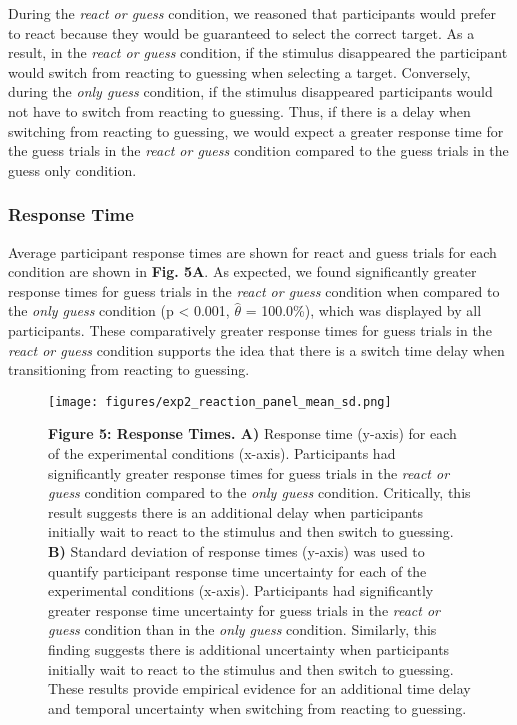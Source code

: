 \documentclass[man,donotrepeattitle,floatsintext,letterpaper,12pt]{apa7}
\newcommand\boldblue[1]{\textcolor{mydarkblue}{\textbf{#1}}}
\begin{document}
During the \emph{react or guess} condition, we reasoned that participants would prefer to react because they would be guaranteed to select the correct target. As a result, in the \emph{react or guess} condition, if the stimulus disappeared the participant would switch from reacting to guessing when selecting a target. Conversely, during the \emph{only guess} condition, if the stimulus disappeared participants would not have to switch from reacting to guessing. Thus, if there is a delay when switching from reacting to guessing, we would expect a greater response time for the guess trials in the \emph{react or guess} condition compared to the guess trials in the guess only condition.

\subsubsection{Response Time} 

\noindent Average participant response times are shown for react and guess trials for each condition are shown in \boldblue{Fig. 5A}. As expected, we found significantly greater response times for guess trials in the \emph{react or guess} condition when compared to the \emph{only guess} condition (p < 0.001, $\hat{\theta}$ = 100.0\%), which was displayed by all participants. These comparatively greater response times for guess trials in the \emph{react or guess} condition supports the idea that there is a switch time delay when transitioning from reacting to guessing.

\begin{figure}[H]
    \centering
    \texttt{[image: figures/exp2\_reaction\_panel\_mean\_sd.png]}
    \caption*{\boldblue{Figure 5: Response Times. A)} Response time (y-axis) for each of the experimental conditions (x-axis). Participants had significantly greater response times for guess trials in the \emph{react or guess} condition compared to the \emph{only guess} condition. Critically, this result suggests there is an additional delay when participants initially wait to react to the stimulus and then switch to guessing. \boldblue{B)} Standard deviation of response times (y-axis) was used to quantify participant response time uncertainty for each of the experimental conditions (x-axis). Participants had significantly greater response time uncertainty for guess trials in the \emph{react or guess} condition than in the \emph{only guess} condition. Similarly, this finding suggests there is additional uncertainty when participants initially wait to react to the stimulus and then switch to guessing. These results provide empirical evidence for an additional time delay and temporal uncertainty when switching from reacting to guessing.}
\end{figure}
\end{document}
